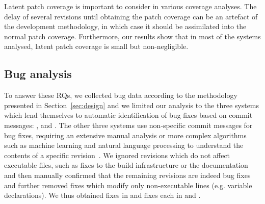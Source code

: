 Latent patch coverage is important to consider in various coverage
analyses. The delay of several revisions until obtaining the patch
coverage can be an artefact of the development methodology, in which
case it should be assimilated into the normal patch coverage. Furthermore,
our results show that in most of the systems analysed, latent patch
coverage is small but non-negligible.

\subsection{Bug analysis}
\label{sec:bugs}

\begin{question}
  \rqeight
\end{question}

\begin{question}
  \rqnine
\end{question}

To answer these RQs, we collected bug data according to the
methodology presented in Section~\ref{sec:design} and we limited our
analysis to the three systems which lend themselves to automatic
identification of bug fixes based on commit messages:
\memcached, \redis and \zeromq.  The other three systems
use non-specific commit messages for bug fixes, requiring an extensive
manual analysis or more complex algorithms such as machine learning
and natural language processing to understand the contents of a
specific revision~\cite{categorization:esem10}.  We ignored revisions
which do not affect executable files, such as fixes to the build
infrastructure or the documentation and then manually confirmed
that the remaining revisions are indeed bug
fixes~\cite{bug-feature:icse13} and further removed fixes which modify
only non-executable lines (e.g. variable declarations). We thus
obtained \memcachedFixes fixes in \memcached and \redisFixes fixes each in \redis
and \zeromq. %

